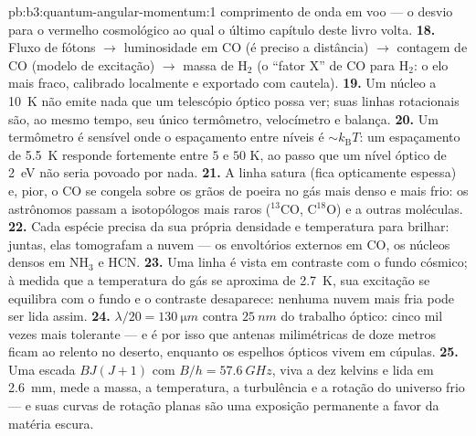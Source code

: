\begin{solution}{pb:b3:quantum-angular-momentum:1}
comprimento de onda em voo --- o desvio para o vermelho cosmológico ao
qual o último capítulo deste livro volta.
\textbf{18.} Fluxo de fótons $\to$ luminosidade em CO (é preciso a
distância) $\to$ contagem de CO (modelo de excitação) $\to$ massa de
H$_2$ (o ``fator X'' de CO para H$_2$: o elo mais fraco, calibrado
localmente e exportado com cautela).
\textbf{19.} Um núcleo a \qty{10}{K} não emite nada que um telescópio
óptico possa ver; suas linhas rotacionais são, ao mesmo tempo, seu
único termômetro, velocímetro e balança.
\textbf{20.} Um termômetro é sensível onde o espaçamento entre níveis é $\sim
k_{\text{B}}T$: um espaçamento de \qty{5.5}{K} responde
fortemente entre $5$ e $50$ K, ao passo que um nível óptico de
\qty{2}{eV} não seria povoado por nada.
\textbf{21.} A linha satura (fica opticamente espessa) e, pior, o CO
se congela sobre os grãos de poeira no gás mais denso e mais frio: os
astrônomos passam a isotopólogos mais raros ($^{13}$CO, C$^{18}$O) e a
outras moléculas.
\textbf{22.} Cada espécie precisa da sua própria densidade e
temperatura para brilhar: juntas, elas tomografam a nuvem --- os
envoltórios externos em CO, os núcleos densos em NH$_3$ e HCN.
\textbf{23.} Uma linha é vista em contraste com o fundo cósmico; à
medida que a temperatura do gás se aproxima de \qty{2.7}{K}, sua
excitação se equilibra com o fundo e o contraste desaparece: nenhuma
nuvem mais fria pode ser lida assim.
\textbf{24.} $\lambda/20 = \qty{130}{\micro m}$ contra
$\qty{25}{nm}$ do trabalho óptico: cinco mil vezes mais tolerante ---
e é por isso que antenas milimétricas de doze metros ficam ao relento
no deserto, enquanto os espelhos ópticos vivem em cúpulas.
\textbf{25.} Uma escada $BJ(J+1)$ com $B/h = \qty{57.6}{GHz}$, viva a
dez kelvins e lida em \qty{2.6}{mm}, mede a massa, a temperatura, a
turbulência e a rotação do universo frio --- e suas curvas de rotação
planas são uma exposição permanente a favor da matéria escura.
\end{solution}

